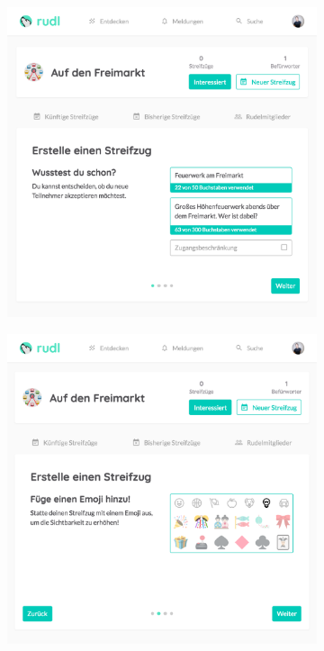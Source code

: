 \documentclass[12pt,numbers=noenddot,parskip,bibliography=totocnumbered,listof=totocnumbered,draft]{scrreprt}
\begin{document}
\begin{figure}
\begin{subfigure}[t]{0.45\textwidth}
\centering
\includegraphics[width=\linewidth]{createexpedition0.png}
\caption{}
\label{createexpedition0}
\end{subfigure}
\hfill
\begin{subfigure}[t]{0.45\textwidth}
\centering
\includegraphics[width=\linewidth]{createexpedition1.png}
\caption{}
\label{createexpedition1}
\end{subfigure}


\end{figure}
\end{document}
